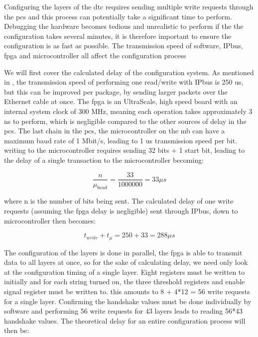 \documentclass[main.tex]{subfiles}
\begin{document}
Configuring the layers of the \gls{dtc} requires sending multiple write requests through the \gls{pcs} and this process can potentially take a significant time to perform. Debugging the hardware becomes tedious and unrealistic to perform if the the configuration takes several minutes, it is therefore important to ensure the configuration is as fast as possible. The transmission speed of software, IPbus, \gls{fpga} and microcontroller all affect the configuration process

We will first cover the calculated delay of the configuration system. As mentioned in , the transmission speed of performing one read/write with IPbus is 250 us, but this can be improved per package, by sending larger packets over the Ethernet cable at once. The \gls{fpga} is an UltraScale, high speed board with an internal system clock of 300 MHz, meaning each operation takes approximately 3 ns to perform, which is negligible compared to the other sources of delay in the \gls{pcs}. The last chain in the \gls{pcs}, the microcontroller on the \gls{mb} can have a maximum baud rate of 1 Mbit/s, leading to 1 us transmission speed per bit. writing to the microcontroller requires sending 32 bits + 1 start bit, leading to the delay of a single transaction to the microcontroller becoming: 

\begin{equation} \label{eqn:mu_calculation}
\frac{n}{\mu_{baud}}=\frac{33}{1000000}=33 \mu s
\end{equation}

where n is the number of bits being sent. The calculated delay of one write requests (assuming the \gls{fpga} delay is negligible) sent through IPbus, down to microcontroller then becomes:

\begin{equation} \label{eqn:write_delay_equation}
t_{write}+t_{\mu }= 250 + 33 = 288\mu s
\end{equation}

The configuration of the layers is done in parallel, the \gls{fpga} is able to transmit data to all layers at once, so for the sake of calculating delay, we need only look at the configuration timing of a single layer. Eight registers must be written to initially and for each string turned on, the three threshold registers and enable signal register must be written to. this amounts to 8 + 4*12 = 56 write requests for a single layer. Confirming the handshake values must be done individually by software and performing 56 write requests for 43 layers leads to reading 56*43 handshake values. The theoretical delay for an entire configuration process will then be:
\end{document}
